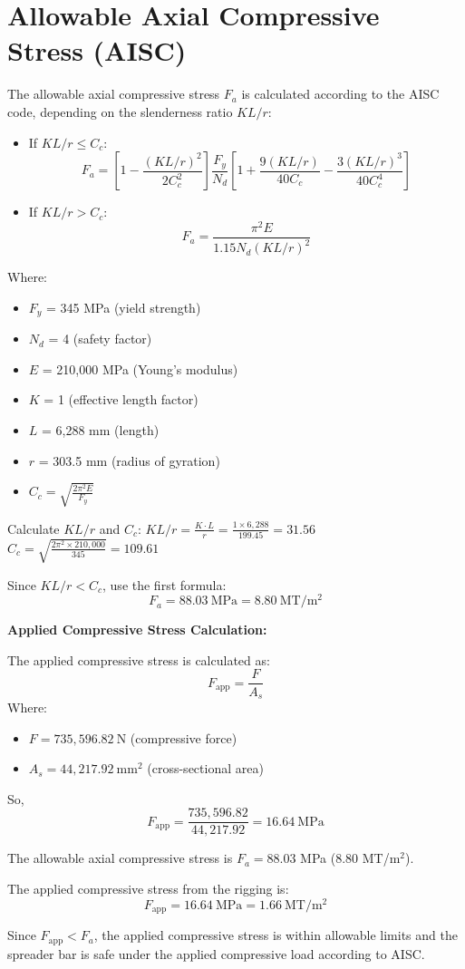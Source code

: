 \documentclass[12pt]{article}
\begin{document}
\section{Allowable Axial Compressive Stress (AISC)}

The allowable axial compressive stress $F_a$ is calculated according to the AISC code, depending on the slenderness ratio $KL/r$:

\begin{itemize}
  \item If $KL/r \leq C_c$:
  \[
  F_a = \left[1 - \frac{(KL/r)^2}{2C_c^2}\right] \frac{F_y}{N_d} \left[1 + \frac{9(KL/r)}{40C_c} - \frac{3(KL/r)^3}{40C_c^4}\right]
  \]
  \item If $KL/r > C_c$:
  \[
  F_a = \frac{\pi^2 E}{1.15 N_d (KL/r)^2}
  \]
\end{itemize}

Where:
\begin{itemize}
  \item $F_y$ = 345 MPa (yield strength)
  \item $N_d$ = 4 (safety factor)
  \item $E$ = 210,000 MPa (Young's modulus)
  \item $K$ = 1 (effective length factor)
  \item $L$ = 6,288 mm (length)
  \item $r$ = 303.5 mm (radius of gyration)
  \item $C_c = \sqrt{\frac{2\pi^2 E}{F_y}}$
\end{itemize}

Calculate $KL/r$ and $C_c$:
\(
KL/r = \frac{K \cdot L}{r} = \frac{1 \times 6,288}{199.45} = 31.56
\)\\
\(
C_c = \sqrt{\frac{2\pi^2 \times 210,000}{345}} = 109.61
\)

Since $KL/r < C_c$, use the first formula:
\[
F_a = 88.03\ \mathrm{MPa} = 8.80\ \mathrm{MT/m^2}
\]

\textbf{Applied Compressive Stress Calculation:}

The applied compressive stress is calculated as:
\[
F_{\text{app}} = \frac{F}{A_s}
\]
Where:
\begin{itemize}
  \item $F = 735,596.82\ \mathrm{N}$ (compressive force)
  \item $A_s = 44,217.92\ \mathrm{mm}^2$ (cross-sectional area)
\end{itemize}
So,
\[
F_{\text{app}} = \frac{735,596.82}{44,217.92} = 16.64\ \mathrm{MPa}
\]

The allowable axial compressive stress is $F_a = 88.03$ MPa ($8.80$ MT/m$^2$).

The applied compressive stress from the rigging is:
\[
F_{\text{app}} = 16.64\ \mathrm{MPa} = 1.66\ \mathrm{MT/m^2}
\]

Since $F_{\text{app}} < F_a$, the applied compressive stress is within allowable limits and the spreader bar is safe under the applied compressive load according to AISC.
\end{document}
